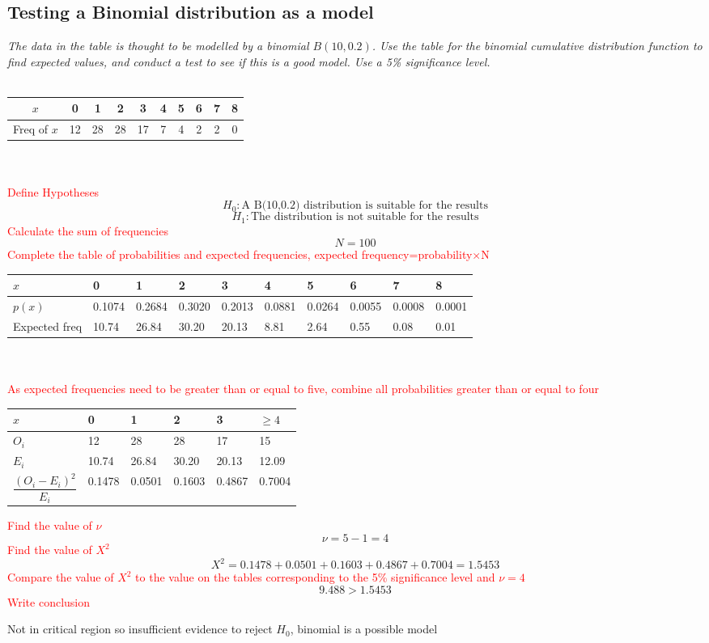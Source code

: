 \documentclass{article}[18pt]
\begin{document}
\subsection{Testing a Binomial distribution as a model}
\textit{The data in the table is thought to be modelled by a binomial $B(10,0.2)$. Use the table for the binomial cumulative distribution function to find expected values, and conduct a test to see if this is a good model. Use a 5\% significance level.}\\
\\
\begin{tabular}{|c|c|c|c|c|c|c|c|c|c|}
\hline
$x$&0&1&2&3&4&5&6&7&8\\
\hline
Freq of $x$&12&28&28&17&7&4&2&2&0\\
\hline
\end{tabular}
\\
\\
\textcolor{red}{Define Hypotheses}
$$H_0: \textrm{A B(10,0.2) distribution is suitable for the results}$$
$$H_1: \textrm{The distribution is not suitable for the results}$$
\textcolor{red}{Calculate the sum of frequencies}
$$N=100$$
\textcolor{red}{Complete the table of probabilities and expected frequencies, expected frequency=probability$\times$N}\\
\begin{tabularx}{\textwidth}{|X|X|X|X|X|X|X|X|X|X|}
\hline
$x$&0&1&2&3&4&5&6&7&8\\
\hline
$p(x)$&0.1074&0.2684&0.3020&0.2013&0.0881&0.0264&0.0055&0.0008&0.0001\\
\hline
Expected freq&10.74&26.84&30.20&20.13&8.81&2.64&0.55&0.08&0.01\\
\hline
\end{tabularx}
\\
\\
\textcolor{red}{As expected frequencies need to be greater than or equal to five, combine all probabilities greater than or equal to four}
\\
\begin{tabularx}{\textwidth}{|X|X|X|X|X|X|}
\hline
$x$&0&1&2&3&$\geqslant4$\\
\hline
$O_i$&12&28&28&17&15\\
\hline
$E_i$&10.74&26.84&30.20&20.13&12.09\\
\hline
$\dfrac{(O_i-E_i)^2}{E_i}$&0.1478&0.0501&0.1603&0.4867&0.7004\\
\hline
\end{tabularx}
\textcolor{red}{Find the value of $\nu$}
$$\nu=5-1=4$$
\textcolor{red}{Find the value of $X^2$}
$$X^2=0.1478+0.0501+0.1603+0.4867+0.7004=1.5453$$
\textcolor{red}{Compare the value of $X^2$ to the value on the tables corresponding to the 5\% significance level and $\nu=4$}
$$9.488>1.5453$$
\textcolor{red}{Write conclusion}
\begin{center}
Not in critical region so insufficient evidence to reject $H_0$, binomial is a possible model
\end{center}
\newpage
\end{document}
